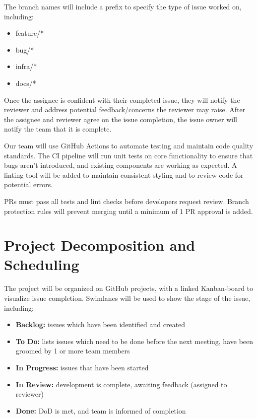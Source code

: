 \documentclass{article}
\begin{document}
The branch names will include a prefix to specify the type of issue worked on, including:
\begin{itemize}
    \item feature/*
    \item bug/*
    \item infra/*
    \item docs/*
\end{itemize}

Once the assignee is confident with their completed issue, they will notify the reviewer and address potential feedback/concerns the reviewer may raise. After the assignee and reviewer agree on the issue completion, the issue owner will notify the team that it is complete.


Our team will use GitHub Actions to automate testing and maintain code quality standards. The CI pipeline will run unit tests on core functionality to ensure that bugs aren’t introduced, and existing components are working as expected. A linting tool will be added to maintain consistent styling and to review code for potential errors.

PRs must pass all tests and lint checks before developers request review. Branch protection rules will prevent merging until a minimum of 1 PR approval is added.

\section{Project Decomposition and Scheduling}
\begin{comment}
\begin{itemize}
  \item How will you be using GitHub projects?
  \item Include a link to your GitHub project
\end{itemize}

\wss{How will the project be scheduled?  This is the big picture schedule, not
details. You will need to reproduce information that is in the course outline
for deadlines.}
\end{comment}

The project will be organized on GitHub projects, with a linked Kanban-board to visualize issue completion. Swimlanes will be used to show the stage of the issue, including:

\begin{itemize}
    \item \textbf{Backlog:} issues which have been identified and created
    \item \textbf{To Do:} lists issues which need to be done before the next meeting, have been groomed by 1 or more team members
    \item \textbf{In Progress:} issues that have been started
    \item \textbf{In Review:} development is complete, awaiting feedback (assigned to reviewer)
    \item \textbf{Done:} DoD is met, and team is informed of completion
\end{itemize}
\end{document}
